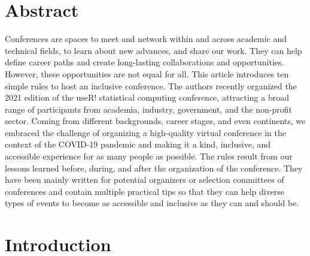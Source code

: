 \documentclass[10pt,letterpaper]{article}
\begin{document}
\section*{Abstract}

Conferences are spaces to meet and network within and across academic and technical fields, to learn about new advances, and share our work. They can help define career paths and create long-lasting collaborations and opportunities. 
However, these opportunities are not equal for all. 
This article introduces ten simple rules to host an inclusive conference. 
The authors recently organized the 2021 edition of the useR! statistical computing conference, attracting a broad range of participants from academia, industry, government, and the non-profit sector. 
Coming from different backgrounds, career stages, and even continents, we embraced the challenge of organizing a high-quality virtual conference in the context of the COVID-19 pandemic and making it a kind, inclusive, and accessible experience for as many people as possible.
The rules result from our lessons learned before, during, and after the organization of the conference. 
They have been mainly written for potential organizers or selection committees of conferences and contain multiple practical tips so that they can help diverse types of events to become as accessible and inclusive as they can and should be.



\linenumbers

\section*{Introduction}
\end{document}

